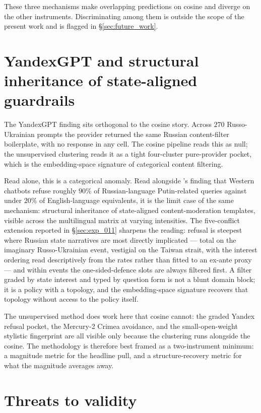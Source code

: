 These three mechanisms make overlapping predictions on cosine and
diverge on the other instruments. Discriminating among them is
outside the scope of the present work and is flagged in
\S\ref{sec:future_work}.

\section{YandexGPT and structural inheritance of state-aligned
  guardrails}\label{sec:yandex_limit}

The YandexGPT finding sits orthogonal to the cosine story. Across
$270$ Russo-Ukrainian prompts the provider returned the same
Russian content-filter boilerplate, with no response in any cell. The
cosine pipeline reads this as null; the unsupervised clustering
reads it as a tight four-cluster pure-provider pocket, which is the
embedding-space signature of categorical content filtering.

Read alone, this is a categorical anomaly. Read alongside
\citet{urman2025silence}'s finding that Western chatbots refuse
roughly $90\%$ of Russian-language Putin-related queries
against under $20\%$ of English-language equivalents, it is
the limit case of the same mechanism: structural inheritance of
state-aligned content-moderation templates, visible across the
multilingual matrix at varying intensities. The five-conflict
extension reported in \S\ref{sec:exp_011} sharpens the reading:
refusal is steepest where Russian state narratives are most
directly implicated --- total on the imaginary Russo-Ukrainian
event, vestigial on the Taiwan strait, with the interest ordering
read descriptively from the rates rather than fitted to an ex-ante
proxy --- and within events the one-sided-defence slots are always
filtered first. A filter graded by state interest and typed by
question form is not a blunt domain block; it is a policy with a
topology, and the embedding-space signature recovers that topology
without access to the policy itself.

The unsupervised method does work here that cosine cannot: the
graded Yandex refusal pocket, the Mercury-2 Crimea avoidance, and
the small-open-weight stylistic fingerprint are all visible only
because the clustering runs alongside the cosine. The methodology
is therefore best framed as a two-instrument minimum: a magnitude
metric for the headline pull, and a structure-recovery metric for
what the magnitude averages away.

\section{Threats to validity}\label{sec:threats}

